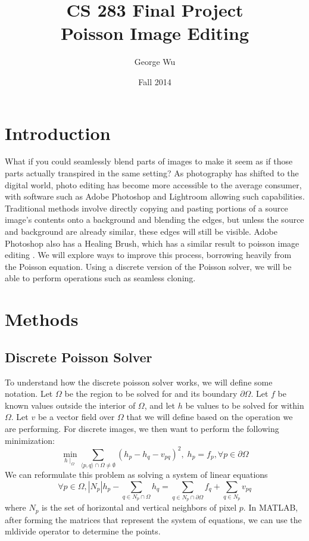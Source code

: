 \documentclass[12pt]{article}
\begin{document}
\title{CS 283 Final Project \\ Poisson Image Editing}
\date{Fall 2014}
\author{George Wu}

\maketitle

\section{Introduction}
What if you could seamlessly blend parts of images to make it seem as if those parts actually transpired in the same setting? As photography has shifted to the digital world, photo editing has become more accessible to the average consumer, with software such as Adobe Photoshop \cite{photoshop} and Lightroom \cite{lightroom} allowing such capabilities. Traditional methods involve directly copying and pasting portions of a source image's contents onto a background and blending the edges, but unless the source and background are already similar, these edges will still be visible. Adobe Photoshop \cite{photoshop} also has a Healing Brush, which has a similar result to poisson image editing \cite{poisson-paper}. We will explore ways to improve this process, borrowing heavily from the Poisson equation. Using a discrete version of the Poisson solver, we will be able to perform operations such as seamless cloning. 

\section{Methods}
\subsection{Discrete Poisson Solver}
To understand how the discrete poisson solver works, we will define some notation. Let $\Omega$ be the region to be solved for and its boundary $\partial \Omega$. Let $f$ be known values outside the interior of $\Omega$, and let $h$ be values to be solved for within $\Omega$. Let $v$ be a vector field over $\Omega$ that we will define based on the operation we are performing. For discrete images, we then want to perform the following minimization:
\begin{equation}
\min_{h \mid_\Omega} \sum_{\langle p,q\rangle \cap \Omega \neq \emptyset} (h_p-h_q- v_{pq})^2, \; h_p = f_p, \forall p \in \partial \Omega
\end{equation}
We can reformulate this problem as solving a system of linear equations 
\begin{equation}
\forall p \in \Omega, |N_p|h_p - \sum_{q\in N_p \cap \Omega} h_q = \sum_{q\in N_p\cap \partial \Omega} f_q + \sum_{q\in N_p} v_{pq}
\end{equation}
where $N_p$ is the set of horizontal and vertical neighbors of pixel $p$. In MATLAB, after forming the matrices that represent the system of equations, we can use the mldivide operator to determine the points.
\end{document}
